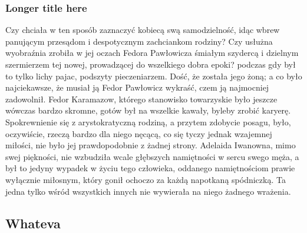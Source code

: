 \documentclass{article}
\begin{document}
\subsubsection[Short title here]{Longer title here}

Czy chciała w ten sposób zaznaczyć kobiecą swą samodzielność, idąc wbrew panującym przesądom i despotycznym zachciankom rodziny? Czy usłużna wyobraźnia zrobiła w jej oczach Fedora Pawłowicza śmiałym szydercą i dzielnym szermierzem tej nowej, prowadzącej do wszelkiego dobra epoki? podczas gdy był to tylko lichy pajac, podszyty pieczeniarzem. Dość, że została jego żoną; a co było najciekawsze, że musiał ją Fedor Pawłowicz wykraść, czem ją najmocniej zadowolnił.
Fedor Karamazow, którego stanowisko towarzyskie było jeszcze wówczas bardzo skromne, gotów był na wszelkie kawały, byleby zrobić karyerę. Spokrewnienie się z arystokratyczną rodziną, a przytem zdobycie posagu, było, oczywiście, rzeczą bardzo dla niego nęcącą, co się tyczy jednak wzajemnej miłości, nie było jej prawdopodobnie z żadnej strony. Adelaida Iwanowna, mimo swej piękności, nie wzbudziła wcale głębszych namiętności w sercu swego męża, a był to jedyny wypadek w życiu tego człowieka, oddanego namiętnościom prawie wyłącznie miłosnym, który gonił ochoczo za każdą napotkaną spódniczką. Ta jedna tylko wśród wszystkich innych nie wywierała na niego żadnego wrażenia.
\subsection{Whateva}
\end{document}

